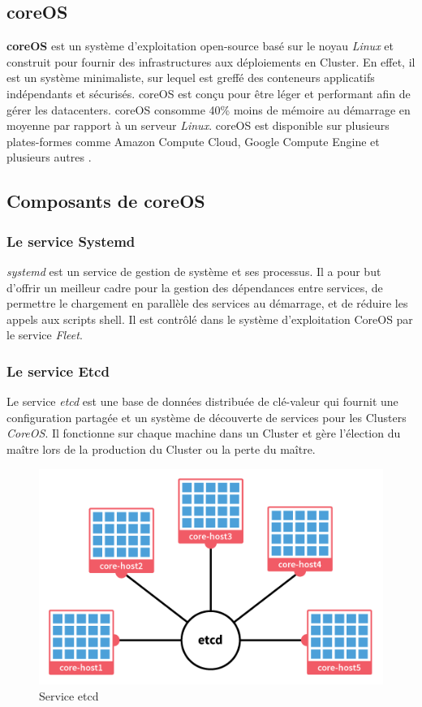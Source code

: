 \begin{onehalfspace}
\section{coreOS}
\textbf{coreOS} est un système d'exploitation open-source basé sur le noyau \emph{Linux} et construit pour fournir des infrastructures aux déploiements en Cluster. En effet, il est un système minimaliste, sur lequel est greffé des conteneurs applicatifs indépendants et sécurisés. coreOS est conçu pour être léger et performant afin de gérer les datacenters. coreOS consomme 40\% moins de mémoire au démarrage en moyenne par rapport à un serveur \emph{Linux}. coreOS est disponible sur plusieurs plates-formes comme Amazon Compute Cloud, Google Compute Engine et plusieurs autres \cite{coreos-cluster}.

\subsection{Composants de coreOS}
\subsubsection*{Le service Systemd}
\emph{systemd} est un service de gestion de système et ses processus. Il a pour but d'offrir un meilleur cadre pour la gestion des dépendances entre services, de permettre le chargement en parallèle des services au démarrage, et de réduire les appels aux scripts shell. Il est contrôlé dans le système d'exploitation CoreOS par le service \emph{Fleet}.
\subsubsection*{Le service Etcd}
Le service \emph{etcd} est une base de données distribuée de clé-valeur qui fournit une configuration partagée et un système de découverte de services pour les Clusters \emph{CoreOS}. Il fonctionne sur chaque machine dans un Cluster et gère l'élection du maître lors de la production du Cluster ou la perte du maître.
\begin{figure}[H]
\centering
\includegraphics [scale=0.4]{chapitre3/assets/etcd-cluster.png}
\caption{Service etcd \cite{coreos}}
\end{figure}

\end{onehalfspace}
